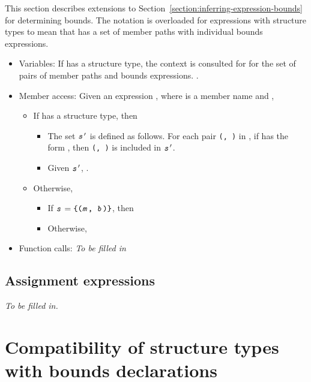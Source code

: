 This section describes extensions to Section~\ref{section:inferring-expression-bounds} for
determining bounds.   The notation  is overloaded for expressions
with structure types to mean that  has a set of member paths with individual bounds expressions.
\begin{itemize}
\item Variables: If  has a structure type, the context is consulted for  for
the set  of pairs of member paths and bounds expressions.  .
\item Member access: Given an expression , where  is 
a member name and ,
\begin{itemize}
\item If  has a structure type, then
\begin{itemize}
\item The set $\texttt{\textit{s}}^{\prime}$ is defined as follows.  For each pair 
      \texttt{(, )} in , if  has the form 
      , then \texttt{(, )} is
      included in $\texttt{\textit{s}}^\prime$.
\item  Given $\texttt{\textit{s}}^\prime$, .
\end{itemize}
\item Otherwise,
\begin{itemize}
\item If $\texttt{\textit{s}} = \texttt{\{(\texttt{\textit{m}}, \texttt{\textit{b}})\}}$, then 
\item Otherwise, 
\end{itemize}
\end{itemize}
\item Function calls: {\em To be filled in}
\end{itemize}

\subsection{Assignment expressions}

{\em To be filled in.}

\section{Compatibility of structure types with bounds declarations}

